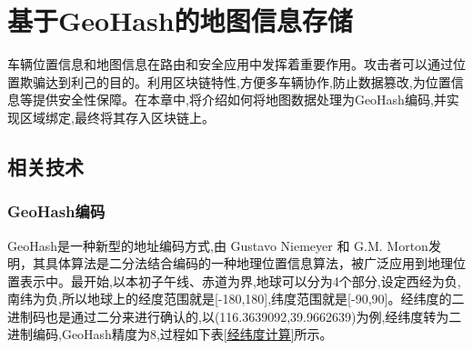 %
%
%
%
%
%
\chapter{基于GeoHash的地图信息存储}
车辆位置信息和地图信息在路由和安全应用中发挥着重要作用。攻击者可以通过位置欺骗达到利己的目的。利用区块链特性,方便多车辆协作,防止数据篡改,为位置信息等提供安全性保障。在本章中,将介绍如何将地图数据处理为GeoHash编码,并实现区域绑定,最终将其存入区块链上。

\section{相关技术}
\subsection{GeoHash编码}
GeoHash是一种新型的地址编码方式,由 Gustavo Niemeyer 和 G.M. Morton发明\cite{lposition}，其具体算法是二分法结合编码的一种地理位置信息算法\cite{liu2014geohash}，被广泛应用到地理位置表示中。最开始,以本初子午线、赤道为界,地球可以分为4个部分,设定西经为负,南纬为负,所以地球上的经度范围就是[-180,180],纬度范围就是[-90,90]。经纬度的二进制码也是通过二分来进行确认的,以(116.3639092,39.9662639)为例,经纬度转为二进制编码,GeoHash精度为8,过程如下表\ref{经纬度计算}所示。

